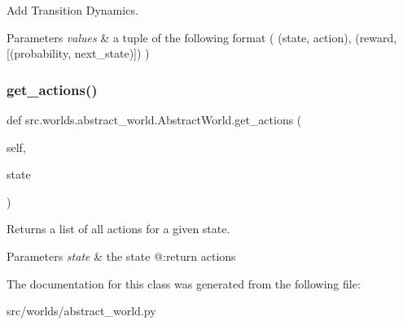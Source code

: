 Add Transition Dynamics. 


\begin{DoxyParams}{Parameters}
{\em values} & a tuple of the following format ( (state, action), (reward, \mbox{[}(probability, next\+\_\+state)\mbox{]}) ) \\
\hline
\end{DoxyParams}
\mbox{\label{classsrc_1_1worlds_1_1abstract__world_1_1_abstract_world_a177196a17a32460d8076eaffa643646b}} 
\subsubsection{\texorpdfstring{get\+\_\+actions()}{get\_actions()}}
{\footnotesize\ttfamily def src.\+worlds.\+abstract\+\_\+world.\+Abstract\+World.\+get\+\_\+actions (\begin{DoxyParamCaption}\item[{}]{self,  }\item[{}]{state }\end{DoxyParamCaption})}



Returns a list of all actions for a given state. 


\begin{DoxyParams}{Parameters}
{\em state} & the state @\+:return actions \\
\hline
\end{DoxyParams}


The documentation for this class was generated from the following file\+:\begin{DoxyCompactItemize}
\item 
src/worlds/abstract\+\_\+world.\+py\end{DoxyCompactItemize}
